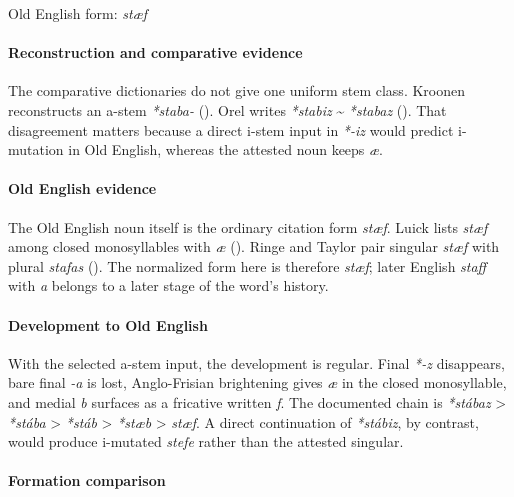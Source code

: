 \documentclass[
  british,
  a4paper,
]{article}
\begin{document}
Old English form: \emph{stæf}

\paragraph{Reconstruction and comparative
evidence}\label{reconstruction-and-comparative-evidence-27}

The comparative dictionaries do not give one uniform stem class. Kroonen
reconstructs an a-stem \emph{*staba-}
(). Orel writes
\emph{*stabiz} \textasciitilde{} \emph{*stabaz}
(). That disagreement matters
because a direct i-stem input in \emph{*-iz} would predict i-mutation in
Old English, whereas the attested noun keeps \emph{æ}.

\paragraph{Old English evidence}\label{old-english-evidence-27}

The Old English noun itself is the ordinary citation form \emph{stæf}.
Luick lists \emph{stæf} among closed monosyllables with \emph{æ}
(). Ringe and Taylor
pair singular \emph{stæf} with plural \emph{stafas}
(). The
normalized form here is therefore \emph{stæf}; later English
\emph{staff} with \emph{a} belongs to a later stage of the word's
history.

\paragraph{Development to Old
English}\label{development-to-old-english-27}

With the selected a-stem input, the development is regular. Final
\emph{*-z} disappears, bare final \emph{-a} is lost, Anglo-Frisian
brightening gives \emph{æ} in the closed monosyllable, and medial
\emph{b} surfaces as a fricative written \emph{f}. The documented chain
is \emph{*stábaz} \textgreater{} \emph{*stába} \textgreater{}
\emph{*stáb} \textgreater{} \emph{*stæb} \textgreater{} \emph{stæf}. A
direct continuation of \emph{*stábiz}, by contrast, would produce
i-mutated \emph{stefe} rather than the attested singular.

\paragraph{Formation comparison}\label{formation-comparison-5}
\end{document}

